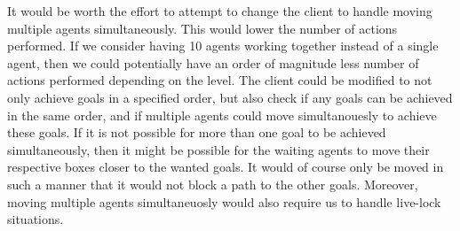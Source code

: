 It would be worth the effort to attempt to change the client to handle moving multiple agents simultaneously.
This would lower the number of actions performed.
If we consider having 10 agents working together instead of a single agent, then we could potentially have an order of magnitude less number of actions performed depending on the level.
The client could be modified to not only achieve goals in a specified order, but also check if any goals can be achieved in the same order, and if multiple agents could move simultanouesly to achieve these goals.
If it is not possible for more than one goal to be achieved simultaneously, then it might be possible for the waiting agents to move their respective boxes closer to the wanted goals.
It would of course only be moved in such a manner that it would not block a path to the other goals.
Moreover, moving multiple agents simultaneuosly would also require us to handle live-lock situations.
